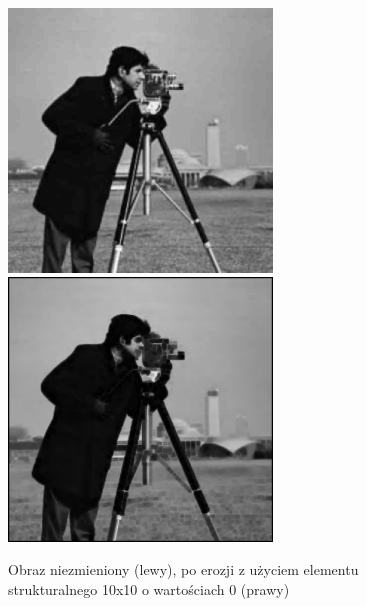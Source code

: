 \documentclass[a4paper,12pt]{book}
\begin{document}
\begin{figure}[H]
	\caption{Obraz niezmieniony (lewy), po erozji z użyciem elementu strukturalnego 10x10 o wartościach 0 (prawy)}
	\includegraphics[width=7cm, height=7cm]{man-unmodified.jpg}
	\includegraphics[width=7cm, height=7cm]{morph-gray-erosion-strel10x10-0.png}
\end{figure}
\end{document}
